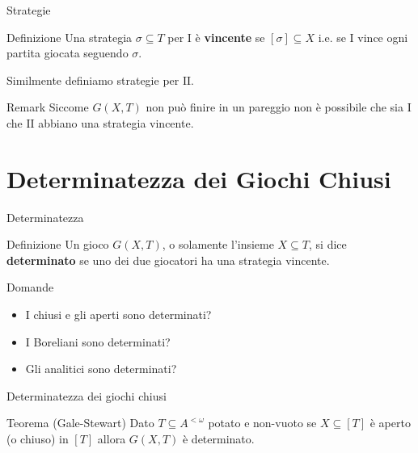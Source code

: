 \documentclass[aspectratio=43]{beamer}
\begin{document}
\begin{frame}{Strategie}
  \begin{block}{Definizione}
    Una strategia \(\sigma \subseteq T\) per \(\mathrm{I}\) è \textbf{vincente} se \([\sigma] \subseteq X\) i.e. se \(\mathrm{I}\) vince ogni partita giocata seguendo \(\sigma\).
  \end{block}
  \pause
  Similmente definiamo strategie per \(\mathrm{II}\).
  \pause
  \begin{block}{Remark}
    Siccome \(G(X, T)\) non può finire in un pareggio non è possibile che sia \(\mathrm{I}\) che \(\mathrm{II}\) abbiano una strategia vincente.
  \end{block}
\end{frame}

\section{Determinatezza dei Giochi Chiusi}

\begin{frame}{Determinatezza}
  \begin{block}{Definizione}
    Un gioco \(G(X, T)\), o solamente l'insieme \(X \subseteq T\), si dice \textbf{determinato} se uno dei due giocatori ha una strategia vincente.
  \end{block}
  \pause
  \begin{block}{Domande}
    \begin{itemize}
    \item I chiusi e gli aperti sono determinati?
    \item I Boreliani sono determinati?
    \item Gli analitici sono determinati?
    \end{itemize}
  \end{block}
\end{frame}

\begin{frame}{Determinatezza dei giochi chiusi}
  \begin{block}{Teorema (Gale-Stewart)}
    Dato \(T \subseteq A^{<\omega}\) potato e non-vuoto se \(X \subseteq [T]\) è aperto (o chiuso) in \([T]\) allora \(G(X, T)\) è determinato.
  \end{block}
\end{frame}
\end{document}
